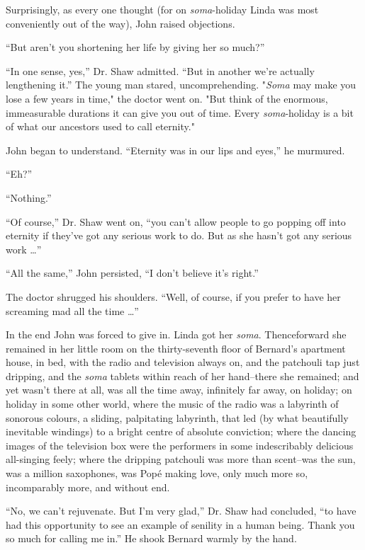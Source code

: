 \documentclass[12pt]{report}
\begin{document}
Surprisingly, as every one thought (for on \emph{soma}-holiday Linda was
most conveniently out of the way), John raised objections.

``But aren't you shortening her life by giving her so much?''

``In one sense, yes,'' Dr. Shaw admitted. ``But in another we're
actually lengthening it.'' The young man stared, uncomprehending.
"\emph{Soma} may make you lose a few years in time," the doctor went on.
"But think of the enormous, immeasurable durations it can give you out
of time. Every \emph{soma}-holiday is a bit of what our ancestors used
to call eternity."

John began to understand. ``Eternity was in our lips and eyes,'' he
murmured.

``Eh?''

``Nothing.''

``Of course,'' Dr. Shaw went on, ``you can't allow people to go popping
off into eternity if they've got any serious work to do. But as she
hasn't got any serious work \ldots{}''

``All the same,'' John persisted, ``I don't believe it's right.''

The doctor shrugged his shoulders. ``Well, of course, if you prefer to
have her screaming mad all the time \ldots{}''

In the end John was forced to give in. Linda got her \emph{soma}.
Thenceforward she remained in her little room on the thirty-seventh
floor of Bernard's apartment house, in bed, with the radio and
television always on, and the patchouli tap just dripping, and the
\emph{soma} tablets within reach of her hand--there she remained; and
yet wasn't there at all, was all the time away, infinitely far away, on
holiday; on holiday in some other world, where the music of the radio
was a labyrinth of sonorous colours, a sliding, palpitating labyrinth,
that led (by what beautifully inevitable windings) to a bright centre of
absolute conviction; where the dancing images of the television box were
the performers in some indescribably delicious all-singing feely; where
the dripping patchouli was more than scent--was the sun, was a million
saxophones, was Popé making love, only much more so, incomparably more,
and without end.

``No, we can't rejuvenate. But I'm very glad,'' Dr. Shaw had concluded,
``to have had this opportunity to see an example of senility in a human
being. Thank you so much for calling me in.'' He shook Bernard warmly by
the hand.
\end{document}
